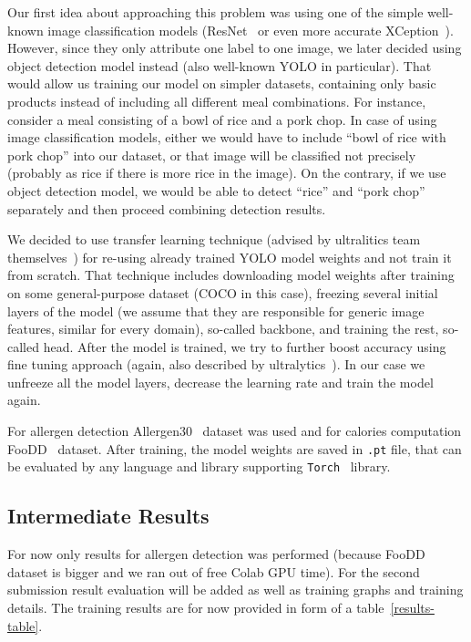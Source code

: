 \documentclass[10pt,twocolumn,letterpaper]{article}
\begin{document}
Our first idea about approaching this problem was using one of the simple well-known image classification models (ResNet~\cite{he2015deepresiduallearningimage} or even more accurate XCeption~\cite{chollet2017xceptiondeeplearningdepthwise}).
However, since they only attribute one label to one image, we later decided using object detection model instead (also well-known YOLO in particular).
That would allow us training our model on simpler datasets, containing only basic products instead of including all different meal combinations.
For instance, consider a meal consisting of a bowl of rice and a pork chop.
In case of using image classification models, either we would have to include ``bowl of rice with pork chop'' into our dataset, or that image will be classified not precisely (probably as rice if there is more rice in the image).
On the contrary, if we use object detection model, we would be able to detect ``rice'' and ``pork chop'' separately and then proceed combining detection results.

We decided to use transfer learning technique (advised by ultralitics team themselves~\cite{ultralytics2024transferlearning}) for re-using already trained YOLO model weights and not train it from scratch.
That technique includes downloading model weights after training on some general-purpose dataset (COCO in this case), freezing several initial layers of the model (we assume that they are responsible for generic image features, similar for every domain), so-called backbone, and training the rest, so-called head.
After the model is trained, we try to further boost accuracy using fine tuning approach (again, also described by ultralytics~\cite{ultralytics2024finetuning}).
In our case we unfreeze all the model layers, decrease the learning rate and train the model again.

For allergen detection Allergen30~\cite{mishra2022allergen30} dataset was used and for calories computation FooDD~\cite{yvk7qk3820} dataset.
After training, the model weights are saved in \texttt{.pt} file, that can be evaluated by any language and library supporting \texttt{Torch}~\cite{torchlibrary} library.

\subsection{Intermediate Results}

For now only results for allergen detection was performed (because FooDD dataset is bigger and we ran out of free Colab GPU time).
For the second submission result evaluation will be added as well as training graphs and training details.
The training results are for now provided in form of a table~\ref{results-table}.
\end{document}
